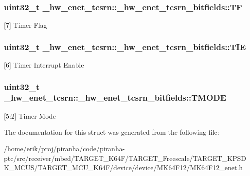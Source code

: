 \subsubsection[{\texorpdfstring{TF}{TF}}]{\setlength{\rightskip}{0pt plus 5cm}uint32\+\_\+t \+\_\+hw\+\_\+enet\+\_\+tcsrn\+::\+\_\+hw\+\_\+enet\+\_\+tcsrn\+\_\+bitfields\+::\+TF}\hypertarget{struct__hw__enet__tcsrn_1_1__hw__enet__tcsrn__bitfields_aa946888b084a27327f1e16b942f76eca}{}\label{struct__hw__enet__tcsrn_1_1__hw__enet__tcsrn__bitfields_aa946888b084a27327f1e16b942f76eca}
\mbox{[}7\mbox{]} Timer Flag 
\subsubsection[{\texorpdfstring{T\+IE}{TIE}}]{\setlength{\rightskip}{0pt plus 5cm}uint32\+\_\+t \+\_\+hw\+\_\+enet\+\_\+tcsrn\+::\+\_\+hw\+\_\+enet\+\_\+tcsrn\+\_\+bitfields\+::\+T\+IE}\hypertarget{struct__hw__enet__tcsrn_1_1__hw__enet__tcsrn__bitfields_a1737ff55f9c67d7271d9fdb6cbdf0f33}{}\label{struct__hw__enet__tcsrn_1_1__hw__enet__tcsrn__bitfields_a1737ff55f9c67d7271d9fdb6cbdf0f33}
\mbox{[}6\mbox{]} Timer Interrupt Enable 
\subsubsection[{\texorpdfstring{T\+M\+O\+DE}{TMODE}}]{\setlength{\rightskip}{0pt plus 5cm}uint32\+\_\+t \+\_\+hw\+\_\+enet\+\_\+tcsrn\+::\+\_\+hw\+\_\+enet\+\_\+tcsrn\+\_\+bitfields\+::\+T\+M\+O\+DE}\hypertarget{struct__hw__enet__tcsrn_1_1__hw__enet__tcsrn__bitfields_adb53544c4a8293bdfa502a7b67235e6e}{}\label{struct__hw__enet__tcsrn_1_1__hw__enet__tcsrn__bitfields_adb53544c4a8293bdfa502a7b67235e6e}
\mbox{[}5\+:2\mbox{]} Timer Mode 

The documentation for this struct was generated from the following file\+:\begin{DoxyCompactItemize}
\item 
/home/erik/proj/piranha/code/piranha-\/ptc/src/receiver/mbed/\+T\+A\+R\+G\+E\+T\+\_\+\+K64\+F/\+T\+A\+R\+G\+E\+T\+\_\+\+Freescale/\+T\+A\+R\+G\+E\+T\+\_\+\+K\+P\+S\+D\+K\+\_\+\+M\+C\+U\+S/\+T\+A\+R\+G\+E\+T\+\_\+\+M\+C\+U\+\_\+\+K64\+F/device/device/\+M\+K64\+F12/M\+K64\+F12\+\_\+enet.\+h\end{DoxyCompactItemize}

